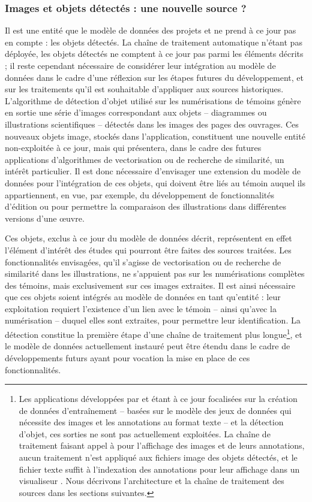 	\subsubsection{Images et objets détectés : une nouvelle source ?}
	Il est une entité que le modèle de données des projets \vhs et \eida ne prend à ce jour pas en compte : les objets détectés. La chaîne de traitement automatique n'étant pas déployée, les objets détectés ne comptent à ce jour pas parmi les éléments décrits ; il reste cependant nécessaire de considérer leur intégration au modèle de données dans le cadre d'une réflexion sur les étapes futures du développement, et sur les traitements qu'il est souhaitable d'appliquer aux sources historiques. L'algorithme de détection d'objet utilisé sur les numérisations de témoins génère en sortie une série d'images correspondant aux objets -- diagrammes ou illustrations scientifiques -- détectés dans les images des pages des ouvrages. Ces nouveaux objets image, stockés dans l'application, constituent une nouvelle entité non-exploitée à ce jour, mais qui présentera, dans le cadre des futures applications d'algorithmes de vectorisation ou de recherche de similarité, un intérêt particulier. Il est donc nécessaire d'envisager une extension du modèle de données pour l'intégration de ces objets, qui doivent être liés au témoin auquel ils appartiennent, en vue, par exemple, du développement de fonctionnalités d'édition ou pour permettre la comparaison des illustrations dans différentes versions d'une œuvre.
	
	Ces objets, exclus à ce jour du modèle de données décrit, représentent en effet l'élément d'intérêt des études qui pourront être faites des sources traitées. Les fonctionnalités envisagées, qu'il s'agisse de vectorisation ou de recherche de similarité dans les illustrations, ne s'appuient pas sur les numérisations complètes des témoins, mais exclusivement sur ces images extraites. Il est ainsi nécessaire que ces objets soient intégrés au modèle de données en tant qu'entité : leur exploitation requiert l'existence d'un lien avec le témoin -- ainsi qu'avec la numérisation -- duquel elles sont extraites, pour permettre leur identification. La détection constitue la première étape d'une chaîne de traitement plus longue\footnote{Les applications développées par \eida et \vhs étant à ce jour focalisées sur la création de données d'entraînement -- basées sur le modèle des jeux de données \yolov qui nécessite des images et les annotations au format texte -- et la détection d'objet, ces sorties ne sont pas actuellement exploitées. La chaîne de traitement faisant appel à \iiif pour l'affichage des images et de leurs annotations, aucun traitement n'est appliqué aux fichiers image des objets détectés, et le fichier texte suffit à l'indexation des annotations pour leur affichage dans un visualiseur \iiif. Nous décrivons l'architecture et la chaîne de traitement des sources dans les sections suivantes.}, et le modèle de données actuellement instauré peut être étendu dans le cadre de développements futurs ayant pour vocation la mise en place de ces fonctionnalités.
